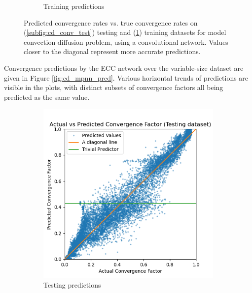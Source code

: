 \documentclass[review]{siamart190516}
\begin{document}
\begin{figure}[h]
\begin{subfigure}{.48\textwidth}
    \caption{Training predictions}
    \label{subfig:cd_conv_train}
  \end{subfigure}
  \caption{Predicted convergence rates vs. true convergence rates on (\ref{subfig:cd_conv_test}) testing and (\ref{subfig:cd_conv_train}) training datasets for model convection-diffusion problem, using a convolutional network. Values closer to the diagonal represent more accurate predictions. }
  \label{fig:cd_conv_pred}
\end{figure}

Convergence predictions by the ECC network over the variable-size dataset are given in Figure \ref{fig:cd_mpnn_pred}.  Various horizontal trends of predictions are visible in the plots, with distinct subsets of convergence factors all being predicted as the same value.

\begin{figure}[h]
  \centering
  \begin{subfigure}{.48\textwidth}
    \includegraphics[width=\textwidth]{figs/cd_var_conv_mpnn_test_pred.png}
    \caption{Testing predictions}
    \label{subfig:cd_mpnn_test}
  \end{subfigure}
  \begin{subfigure}{.48\textwidth}

\end{subfigure}
\end{figure}
\end{document}
